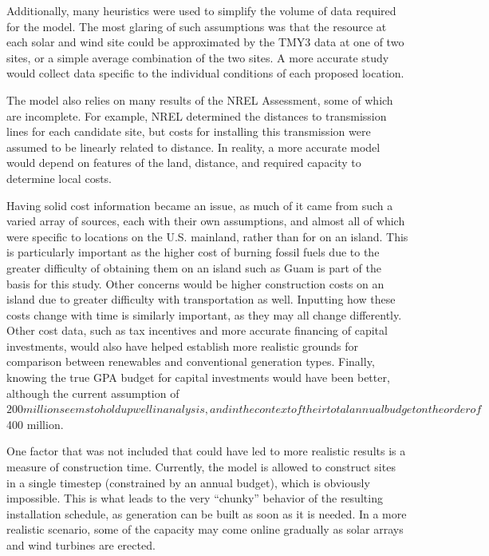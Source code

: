 \documentclass[12pt,letterpaper,fleqn]{article}
\begin{document}
Additionally, many heuristics were used to simplify the volume of data
required for the model. The most glaring of such assumptions was that the
resource at each solar and wind site could be approximated by the TMY3
data at one of two sites, or a simple average combination of the two
sites. A more accurate study would collect data specific to the
individual conditions of each proposed location.

The model also relies on many results of the NREL Assessment, some of
which are incomplete. For example, NREL determined the distances to
transmission lines for each candidate site, but costs for installing
this transmission were assumed to be linearly related to distance. In
reality, a more accurate model would depend on features of the land,
distance, and required capacity to determine local costs.

Having solid cost information became an issue, as much of it came from 
such a varied array of sources, each with their own assumptions, and almost
all of which were specific to locations on the U.S. mainland, rather than 
for on an island. This is particularly important as the higher cost of burning 
fossil fuels due to the greater difficulty of obtaining them on an island such as
Guam is part of the basis for this study. Other concerns would be higher 
construction costs on an island due to greater difficulty with transportation 
as well. Inputting how these costs change with time is similarly important, as they
may all change differently. Other cost data, such as tax incentives and more 
accurate financing of capital investments, would also have helped establish 
more realistic grounds for comparison between renewables and 
conventional generation types. Finally, knowing the true GPA budget for
capital investments would have been better, although the current assumption
of $200 million seems to hold up well in analysis, and in the context of 
their total annual budget on the order of $400 million.

One factor that was not included that could have led to more realistic
results is a measure of construction time. Currently, the model is
allowed to construct sites in a single timestep (constrained by an
annual budget), which is obviously impossible. This is what leads to
the very ``chunky'' behavior of the resulting installation schedule,
as generation can be built as soon as it is needed. In a more
realistic scenario, some of the capacity may come online gradually as
solar arrays and wind turbines are erected.
\end{document}
